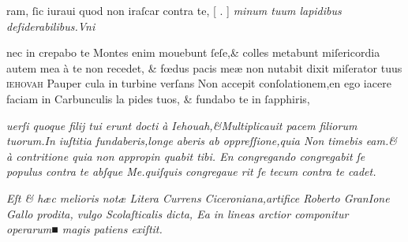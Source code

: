 \documentclass{article}
\begin{document}
\fontsize{7}{8}\selectfont
\vspace{-2.5\baselineskip}
\noindent ram, ſic iuraui quod non iraſcar contra te, [ %
		{\grecs {}\selectfont{} \scalebox{0.5}{}\kern-2pt\scalebox{1.2}{}.} ] \textit{minum tuum lapidibus deſiderabilibus.Vni\linebreak}
\vspace{-2.55\baselineskip}
\begin{multicols}{2}
	\fontsize{7}{8}\selectfont
	\justifying
	\noindent nec in crepabo te Montes enim mouebunt ſeſe,\& colles metabunt miſericordia autem mea\linebreak
	\`a te non recedet, \& f\oe{}dus pacis me\ae{} non nutabit dixit miſerator tuus \textsc{ iehovah} Pauper\linebreak
	cula in turbine verſans Non accepit conſolationem,en ego iacere faciam in Carbunculis la\linebreak
	pides tuos, \& fundabo te in ſapphiris,

	\columnbreak
	\justifying
	\noindent
	\textit{uerſi quoque filij tui erunt docti \`a Iehouah,\&Multiplicauit pacem filiorum tuorum.In iuſtitia\linebreak
	fundaberis,longe aberis ab oppreſſione,quia Non timebis eam.\& \`a contritione quia non appropin\linebreak
	quabit tibi. {E}n congregando congregabit ſe populus contra te abſque {M}e.quiſquis congregaue\linebreak
	rit ſe tecum contra te cadet.}
\end{multicols}
\vspace{-1\baselineskip}
\raggedright
\noindent{}  \normalsize {\large \scalebox{0.7}{☞}} \fontsize{6}{7}\selectfont\textit{Eſt \& h\ae{}c melioris not\ae{} Litera Currens Ciceroniana,artifice Roberto GranIone Gallo prodita, vulgo Scolaſticalis dicta, Ea in lineas arctior componitur operarum■ magis patiens exiſtit.}
\end{document}
